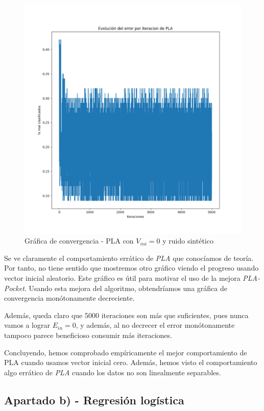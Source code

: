 \documentclass[11pt]{article}
\begin{document}
\begin{figure}[H]
    \centering
    \includegraphics[scale=0.4]{grafica_convergencia_pla_ruido_cero}
    \caption{Gráfica de convergencia - PLA con $V_{ini} = 0$ y ruido sintético}
\end{figure}

Se ve claramente el comportamiento errático de \emph{PLA} que conocíamos de teoría. Por tanto, no tiene sentido que mostremos otro gráfico viendo el progreso usando vector inicial aleatorio. Este gráfico es útil para motivar el uso de la mejora \emph{PLA-Pocket}. Usando esta mejora del algoritmo, obtendríamos una gráfica de convergencia monótonamente decreciente.

Además, queda claro que 5000 iteraciones son más que suficientes, pues nunca vamos a lograr $E_{in} = 0$, y además, al no decrecer el error monótonamente tampoco parece beneficioso consumir más iteraciones.

Concluyendo, hemos comprobado empíricamente el mejor comportamiento de PLA cuando usamos vector inicial cero. Además, hemos visto el comportamiento algo errático de \emph{PLA} cuando los datos no son linealmente separables.

\pagebreak
\subsection{Apartado b) - Regresión logística}
\end{document}
